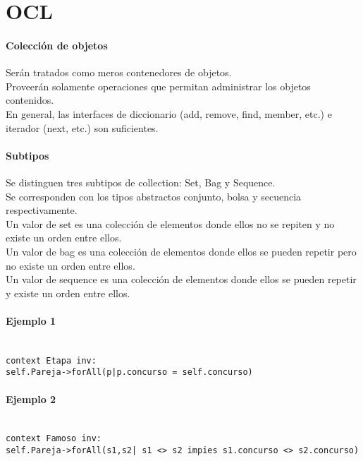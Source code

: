 \documentclass[a4paper,12pt,oneside]{report}
\begin{document}

    \section{OCL}

        \paragraph{Colecci\'on de objetos}
          Ser\'an tratados como meros contenedores de objetos.\\
          Proveer\'an solamente operaciones que permitan administrar los objetos
          contenidos.\\
          En general, las interfaces de diccionario (add, remove, find, member, etc.)
          e iterador (next, etc.) son suficientes.

        \paragraph{Subtipos}
          Se distinguen tres subtipos de collection: Set, Bag y Sequence.\\
          Se corresponden con los tipos abstractos conjunto, bolsa y secuencia
          respectivamente.\\
          Un valor de set es una colecci\'on de elementos donde ellos no se repiten
          y no existe un orden entre ellos.\\
          Un valor de bag es una colecci\'on de elementos donde ellos se pueden repetir
          pero no existe un orden entre ellos.\\
          Un valor de sequence es una colecci\'on de elementos donde ellos se pueden
          repetir y existe un orden entre ellos.

        \paragraph{Ejemplo 1}
          \texttt{\\
             context Etapa inv:\\
             self.Pareja->forAll(p|p.concurso = self.concurso)
          }

        \paragraph{Ejemplo 2}
          \texttt{\\
             context Famoso inv:\\
             self.Pareja->forAll(s1,s2| s1 <> s2 impies s1.concurso <> s2.concurso)
          }
\end{document}

